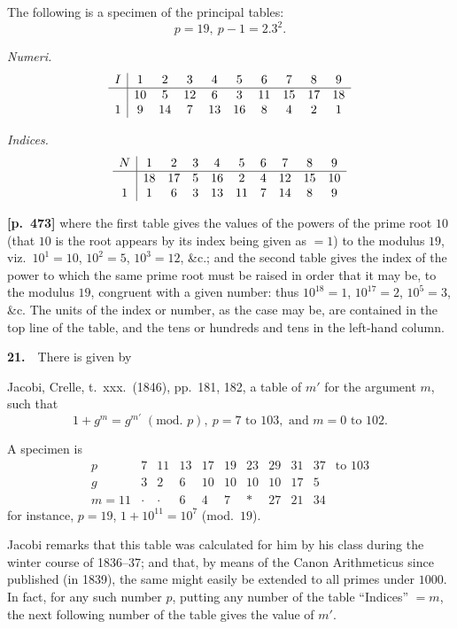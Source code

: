 \documentclass[11pt,a4paper]{article}
\begin{document}
The following is a specimen of the principal tables:
\[
p=19,\ p-1=2.3^2.
\]

\textit{Numeri.}
\[
\begin{array}{c|ccccccccc}
I & 1 & 2 & 3 & 4 & 5 & 6 & 7 & 8 & 9 \\\hline
  & 10& 5 & 12& 6 & 3 & 11& 15& 17& 18 \\
1 & 9 & 14& 7 & 13& 16& 8 & 4 & 2 & 1
\end{array}
\]

\textit{Indices.}
\[
\begin{array}{c|ccccccccc}
N & 1 & 2 & 3 & 4 & 5 & 6 & 7 & 8 & 9 \\\hline
  & 18& 17& 5 & 16& 2 & 4 & 12& 15& 10 \\
1 & 1 & 6 & 3 & 13& 11& 7 & 14& 8 & 9
\end{array}
\]

\bigskip
\noindent\textbf{[p.~473]}\quad
where the first table gives the values of the powers of the prime root $10$ (that $10$ is the root appears by its index being given as $=1$) to the modulus $19$, viz.\ $10^1=10$, $10^2=5$, $10^3=12$, \&c.; and the second table gives the index of the power to which the same prime root must be raised in order that it may be, to the modulus $19$, congruent with a given number: thus $10^{18}=1$, $10^{17}=2$, $10^5=3$, \&c.   The units of the index or number, as the case may be, are contained in the top line of the table, and the tens or hundreds and tens in the left-hand column.

\textbf{21.}\ \ There is given by

Jacobi, Crelle, t.~xxx.\ (1846), pp.~181, 182, a table of $m'$ for the argument $m$, such that
\[
1+g^m = g^{m'}\;(\text{mod.\ }p),\ p=7\text{ to }103,\text{ and }m=0\text{ to }102.
\]

A specimen is
\[
\begin{array}{c|ccccccccc|c}
p & 7 & 11 & 13 & 17 & 19 & 23 & 29 & 31 & 37 & \text{to }103 \\
g & 3 & 2  & 6  & 10 & 10 & 10 & 10 & 17 & 5  & \\\hline
m=11 & \cdot & \cdot & 6 & 4 & 7 & * & 27 & 21 & 34 &
\end{array}
\]
for instance, $p=19$, $1+10^{11}=10^7$ (mod.\ $19$).

Jacobi remarks that this table was calculated for him by his class during the winter course of 1836--37; and that, by means of the Canon Arithmeticus since published (in 1839), the same might easily be extended to all primes under $1000$.   In fact, for any such number $p$, putting any number of the table ``Indices'' $=m$, the next following number of the table gives the value of $m'$.
\end{document}
